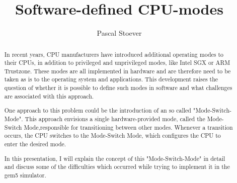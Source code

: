 \documentclass{article}
\title{Software-defined CPU-modes}
\author{Pascal Stoever}
\begin{document}
\maketitle

\begin{abstract}
In recent years, CPU manufacturers have introduced additional operating modes to
their CPUs, in addition to privileged and unprivileged modes, like Intel SGX or
ARM Trustzone. These modes are all implemented in hardware and are therefore
need to be taken as is to the operating system and applications. This
development raises the question of whether it is possible to define such modes
in software and what challenges are associated with this approach.\par

One approach to this problem could be the introduction of an so called
"Mode-Switch-Mode". This approach envisions a single hardware-provided mode,
called the Mode-Switch Mode,responsible for transitioning between other modes.
Whenever a transition occurs, the CPU switches to the Mode-Switch Mode, which
configures the CPU to enter the desired mode.\par

In this presentation, I will explain the concept of this "Mode-Switch-Mode" in
detail and discuss some of the difficulties which occurred while trying to
implement it in the gem5 simulator.




\end{abstract}
\end{document}
